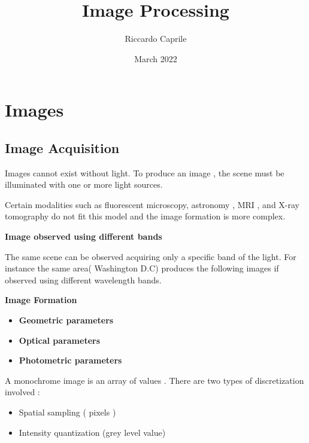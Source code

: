 \documentclass{article}
\title{Image Processing}
\author{Riccardo Caprile}
\date{March 2022}
\begin{document}
\maketitle

\section{Images}
\subsection{Image Acquisition}
Images cannot exist without light. To produce an image , the scene must be illuminated with one or more light sources.

Certain modalities such as fluorescent microscopy, astronomy , MRI , and X-ray tomography do not fit this model and the image formation is more complex. 

\vspace{2mm}

\textbf{Image observed using different bands}
\vspace{2mm}

The same scene can be observed acquiring only a specific band of the light. 
For instance the same area( Washington D.C) produces the following images if observed using different wavelength bands.

\vspace{2mm}

\textbf{Image Formation}
\vspace{2mm}

\begin{itemize}
    \item \textbf{Geometric parameters} 
    \item \textbf{Optical parameters} 
    \item \textbf{Photometric parameters} 
\end{itemize}

A monochrome image is an array of values . There are two types of discretization involved :
    \begin{itemize}
        \item Spatial sampling ( pixels )
        \item Intensity quantization (grey level value)
    \end{itemize}
\end{document}
